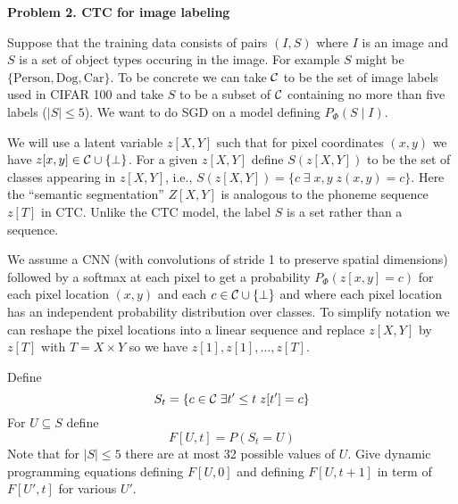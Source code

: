 
\bigskip
{\bf Problem 2. CTC for image labeling}

Suppose that the training data consists of pairs $(I,S)$ where $I$ is an image and $S$
is a set of object types occuring in the image.  For example $S$ might be $\{\mathrm{Person},\mathrm{Dog},\mathrm{Car}\}$.
To be concrete we can take ${\cal C}$ to be the set of image labels used in CIFAR 100 and take $S$ to be a subset
of ${\cal C}$ containing no more than five labels ($|S| \leq 5$).
We want to do SGD on a model defining $P_\Phi(S\;|\;I)$.

We will use a latent variable $z[X,Y]$ such that for pixel coordinates $(x,y)$ we have $z[x,y] \in {\cal C} \cup \{\bot\}$.
For a given $z[X,Y]$ define $S(z[X,Y])$ to be the set of classes appearing in $z[X,Y]$, i.e.,
$S(z[X,Y]) = \{c\;\exists\;x,y\;z(x,y) = c\}$. Here the ``semantic segmentation'' $Z[X,Y]$ is analogous to the phoneme
sequence $z[T]$ in CTC. Unlike the CTC model, the label
$S$ is a set rather than a sequence.

We assume a CNN (with convolutions of stride 1 to preserve spatial dimensions) followed by
a softmax at each pixel to get a probability
$P_\Phi(z[x,y] = c)$ for each pixel location $(x,y)$ and each $c \in {\cal C} \cup \{\bot\}$ and where
each pixel location has an independent probability distribution over classes. 
To simplify notation we can reshape the pixel locations into a linear sequence
and replace $z[X,Y]$ by $z[T]$ with $T = X \times Y$ so we have $z[1],z[1],\ldots,z[T]$.

Define
$$S_t = \{c \in {\cal C}\;\exists t'\leq t\;z[t'] = c\}$$
For $U \subseteq S$ define
$$F[U,t] = P(S_t = U)$$
Note that for $|S| \leq 5$ there are at most 32 possible values of $U$.
Give dynamic programming equations defining $F[U,0]$ and defining $F[U,t+1]$ in term of $F[U',t]$ for various $U'$.




  

